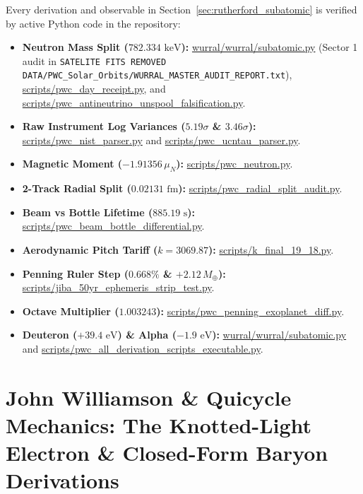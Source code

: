 \documentclass[11pt,a4paper]{article}
\begin{document}
Every derivation and observable in Section~\ref{sec:rutherford_subatomic} is verified by active Python code in the repository:
\begin{itemize}
    \item \textbf{Neutron Mass Split ($782.334\text{ keV}$):} \url{wurral/wurral/subatomic.py} (Sector 1 audit in \texttt{SATELITE FITS REMOVED DATA/\allowbreak PWC\_\allowbreak Solar\_\allowbreak Orbits/\allowbreak WURRAL\_\allowbreak MASTER\_\allowbreak AUDIT\_\allowbreak REPORT.txt}), \url{scripts/pwc_day_receipt.py}, and \url{scripts/pwc_antineutrino_unspool_falsification.py}.
    \item \textbf{Raw Instrument Log Variances ($5.19\sigma$ \& $3.46\sigma$):} \url{scripts/pwc_nist_parser.py} and \url{scripts/pwc_ucntau_parser.py}.
    \item \textbf{Magnetic Moment ($-1.91356\,\mu_N$):} \url{scripts/pwc_neutron.py}.
    \item \textbf{2-Track Radial Split ($0.02131\text{ fm}$):} \url{scripts/pwc_radial_split_audit.py}.
    \item \textbf{Beam vs Bottle Lifetime ($885.19\text{ s}$):} \url{scripts/pwc_beam_bottle_differential.py}.
    \item \textbf{Aerodynamic Pitch Tariff ($k = 3069.87$):} \url{scripts/k_final_19_18.py}.
    \item \textbf{Penning Ruler Step ($0.668\%$ \& $+2.12\,M_\oplus$):} \url{scripts/jiba_50yr_ephemeris_strip_test.py}.
    \item \textbf{Octave Multiplier ($1.003243$):} \url{scripts/pwc_penning_exoplanet_diff.py}.
    \item \textbf{Deuteron ($+39.4\text{ eV}$) \& Alpha ($-1.9\text{ eV}$):} \url{wurral/wurral/subatomic.py} and \url{scripts/pwc_all_derivation_scripts_executable.py}.
\end{itemize}


\section{John Williamson \& Quicycle Mechanics: The Knotted-Light Electron \& Closed-Form Baryon Derivations}
\label{sec:williamson_quicycle}
\end{document}
